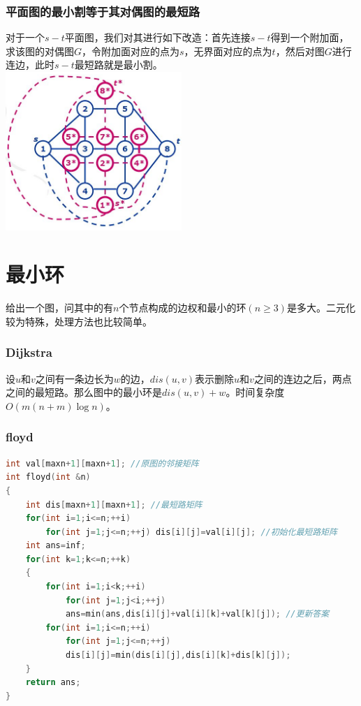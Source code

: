 \documentclass[a4paper]{book}
\begin{document}
\subsubsection{平面图的最小割等于其对偶图的最短路}
对于一个$s-t$平面图，我们对其进行如下改造：首先连接$s-t$得到一个附加面，求该图的对偶图$G$，令附加面对应的点为$s$，无界面对应的点为$t$，然后对图$G$进行连边，此时$s-t$最短路就是最小割。\\
\includegraphics[width=0.5\textwidth,center]{../photo/duiou2.png}
\section{最小环}
给出一个图，问其中的有$n$个节点构成的边权和最小的环$(n\ge3)$是多大。二元化较为特殊，处理方法也比较简单。
\subsubsection{Dijkstra}
设$u$和$v$之间有一条边长为$w$的边，$dis(u,v)$表示删除$u$和$v$之间的连边之后，两点之间的最短路。那么图中的最小环是$dis(u,v)+w$。时间复杂度$O(m(n+m)\log n)$。
\subsubsection{floyd}
\begin{lstlisting}[language=c++,escapeinside=``]
int val[maxn+1][maxn+1]; //原图的邻接矩阵
int floyd(int &n) 
{
    int dis[maxn+1][maxn+1]; //最短路矩阵
    for(int i=1;i<=n;++i)
        for(int j=1;j<=n;++j) dis[i][j]=val[i][j]; //初始化最短路矩阵
    int ans=inf;
    for(int k=1;k<=n;++k) 
    {
        for(int i=1;i<k;++i)
            for(int j=1;j<i;++j)
            ans=min(ans,dis[i][j]+val[i][k]+val[k][j]); //更新答案
        for(int i=1;i<=n;++i)
            for(int j=1;j<=n;++j)
            dis[i][j]=min(dis[i][j],dis[i][k]+dis[k][j]);
    }
    return ans;
}
\end{lstlisting}
\ifx\allfiles\undefined
\end{document}
